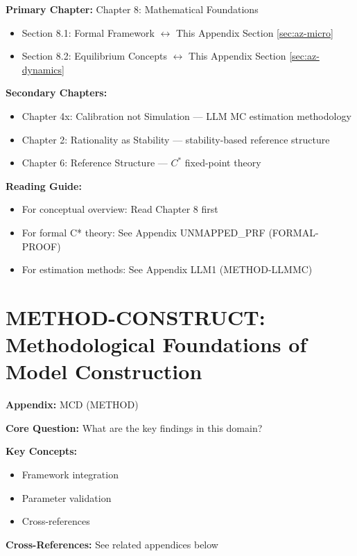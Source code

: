 \begin{tcolorbox}[colback=purple!5!white, colframe=purple!75!black,
    title=Chapter Linkage]

\textbf{Primary Chapter:} Chapter 8: Mathematical Foundations
\begin{itemize}[nosep]
\item Section 8.1: Formal Framework $\leftrightarrow$ This Appendix Section \ref{sec:az-micro}
\item Section 8.2: Equilibrium Concepts $\leftrightarrow$ This Appendix Section \ref{sec:az-dynamics}
\end{itemize}

\textbf{Secondary Chapters:}
\begin{itemize}[nosep]
\item Chapter 4x: Calibration not Simulation --- LLM MC estimation methodology
\item Chapter 2: Rationality as Stability --- stability-based reference structure
\item Chapter 6: Reference Structure --- $C^*$ fixed-point theory
\end{itemize}

\textbf{Reading Guide:}
\begin{itemize}[nosep]
\item For conceptual overview: Read Chapter 8 first
\item For formal C* theory: See Appendix UNMAPPED_PRF (FORMAL-PROOF)
\item For estimation methods: See Appendix LLM1 (METHOD-LLMMC)
\end{itemize}

\end{tcolorbox}

\chapter{METHOD-CONSTRUCT: Methodological Foundations of Model Construction}
\label{app:az-construct}


\begin{tcolorbox}[colback=blue!5!white, colframe=blue!75!black,
    title=Quick Reference: Appendix UNMAPPED_MCD]

\textbf{Appendix:} MCD (METHOD)

\textbf{Core Question:} What are the key findings in this domain?

\textbf{Key Concepts:}
\begin{itemize}[nosep]
\item Framework integration
\item Parameter validation
\item Cross-references
\end{itemize}

\textbf{Cross-References:} See related appendices below
\end{tcolorbox}

